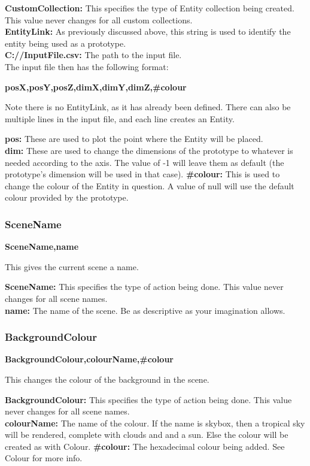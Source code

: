 \documentclass[a4paper,12pt]{article}
\begin{document}
\textbf{CustomCollection:} This specifies the type of Entity collection being created. This value never changes for all custom collections.\\
\textbf{EntityLink:} As previously discussed above, this string is used to identify the entity being used as a prototype.\\
\textbf{C://InputFile.csv:} The path to the input file.\\

The input file then has the following format:

\textbf{posX,posY,posZ,dimX,dimY,dimZ,\#colour}

Note there is no EntityLink, as it has already been defined. There can also be multiple lines in the input file, and each line creates an Entity.

\textbf{pos:} These are used to plot the point where the Entity will be placed.\\
\textbf{dim:} These are used to change the dimensions of the prototype to whatever is needed according to the axis. The value of -1 will leave them as default (the prototype's dimension will be used in that case).
\textbf{\#colour:} This is used to change the colour of the Entity in question. A value of null will use the default colour provided by the prototype.

\subsubsection{SceneName}

\textbf{SceneName,name}

This gives the current scene a name.

\textbf{SceneName:} This specifies the type of action being done. This value never changes for all scene names.\\
\textbf{name:} The name of the scene. Be as descriptive as your imagination allows.

\subsubsection{BackgroundColour}

\textbf{BackgroundColour,colourName,\#colour}

This changes the colour of the background in the scene.

\textbf{BackgroundColour:} This specifies the type of action being done. This value never changes for all scene names.\\
\textbf{colourName:} The name of the colour. If the name is skybox, then a tropical sky will be rendered, complete with clouds and and a sun. Else the colour will be created as with Colour.
\textbf{\#colour:} The hexadecimal colour being added. See Colour for more info.

%
%
\end{document}
